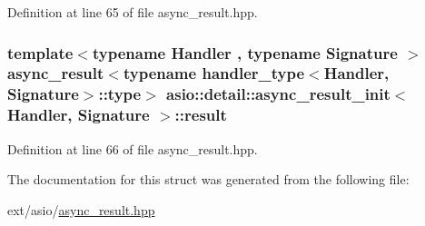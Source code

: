 Definition at line 65 of file async\+\_\+result.\+hpp.

\hypertarget{structasio_1_1detail_1_1async__result__init_a6b805f5a8bcfddb4f6766b0fb7f0d837}{}
\subsubsection[{result}]{\setlength{\rightskip}{0pt plus 5cm}template$<$typename Handler , typename Signature $>$ {\bf async\+\_\+result}$<$typename {\bf handler\+\_\+type}$<$Handler, Signature$>$\+::type$>$ {\bf asio\+::detail\+::async\+\_\+result\+\_\+init}$<$ Handler, Signature $>$\+::result}\label{structasio_1_1detail_1_1async__result__init_a6b805f5a8bcfddb4f6766b0fb7f0d837}


Definition at line 66 of file async\+\_\+result.\+hpp.



The documentation for this struct was generated from the following file\+:\begin{DoxyCompactItemize}
\item 
ext/asio/\hyperlink{async__result_8hpp}{async\+\_\+result.\+hpp}\end{DoxyCompactItemize}
